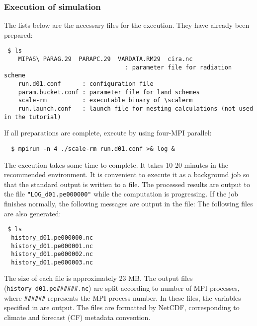 \subsubsection{Execution of simulation}

The lists below are the necessary files for the execution. They have already been prepared:
\begin{verbatim}
 $ ls
    MIPAS\ PARAG.29  PARAPC.29  VARDATA.RM29  cira.nc
                                  : parameter file for radiation scheme
    run.d01.conf      : configuration file
    param.bucket.conf : parameter file for land schemes
    scale-rm          : executable binary of \scalerm
    run.launch.conf   : launch file for nesting calculations (not used in the tutorial)
\end{verbatim}
If all preparations are complete, execute \scalerm by using four-MPI parallel:
\begin{verbatim}
  $ mpirun -n 4 ./scale-rm run.d01.conf >& log &
\end{verbatim}
The execution takes some time to complete. It takes 10-20 minutes in the recommended environment. It is convenient to execute it as a background job  so that the standard output is written to a file. The processed results are output to the file \verb|"LOG_d01.pe000000"| while the computation is progressing.  If the job finishes normally, the following messages are output in the file:
The following files are also generated:
\begin{verbatim}
 $ ls
  history_d01.pe000000.nc
  history_d01.pe000001.nc
  history_d01.pe000002.nc
  history_d01.pe000003.nc
\end{verbatim}
The size of each file is approximately 23 MB.
The output files (\verb|history_d01.pe######.nc|) are
split according to number of MPI processes,
where \verb|######| represents the MPI process number.
In these files, the variables specified in  are output.
The files are formatted by NetCDF,
corresponding to climate and forecast (CF) metadata convention.




